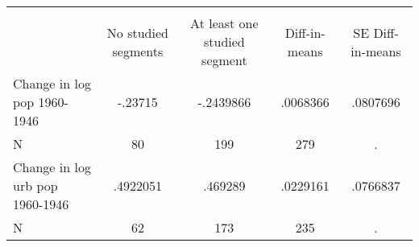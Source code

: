 \begin{tabular}{l*{4}{c}}
\hline\hline
            &\multicolumn{4}{c}{}                               \\
            &No studied segments&At least one studied segment&Diff-in-means&SE Diff-in-means\\
\hline
Change in log pop 1960-1946&     -.23715&   -.2439866&    .0068366&    .0807696\\
N           &          80&         199&         279&           .\\
Change in log urb pop 1960-1946&    .4922051&     .469289&    .0229161&    .0766837\\
N           &          62&         173&         235&           .\\
\hline\hline
\end{tabular}
